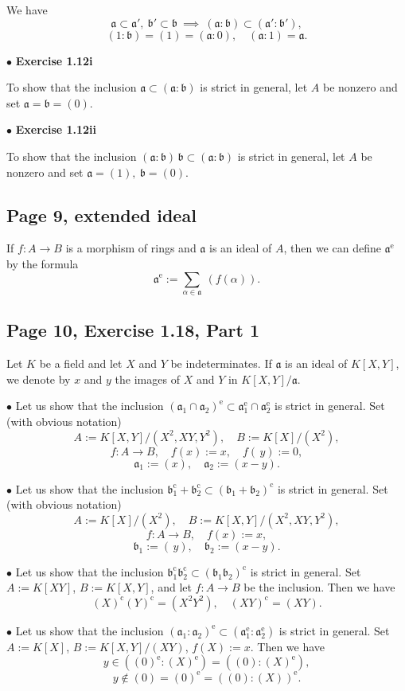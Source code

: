 \documentclass[parskip=half,fontsize=12pt]{scrartcl}%
\newcommand{\oo}{\operatorname}\newcommand{\ooo}{\operatorname*}
\newcommand{\mf}{\mathfrak}
\newcommand{\bbb}{\mf b}
\newcommand{\bu}{\bullet}
\begin{document}
We have 
$$
\mf a\subset\mf a',\ \bbb'\subset\bbb\ \implies\ (\mf a:\bbb)\subset(\mf a':\bbb'),
$$ 
$$
(1:\bbb)=(1)=(\mf a:0),\quad(\mf a:1)=\mf a.
$$

$\bu$ \textbf{Exercise 1.12i}%

To show that the inclusion $\mf a\subset(\mf a:\bbb)$ is strict in general, let $A$ be nonzero and set $\mf a=\bbb=(0)$.

$\bu$ \textbf{Exercise 1.12ii}%

To show that the inclusion $(\mf a\!:\!\bbb)\,\bbb\subset(\mf a:\bbb)$ is strict in general, let $A$ be nonzero and set $\mf a=(1),\ \bbb=(0)$.

\subsection{Page 9, extended ideal}%

If $f:A\to B$ is a morphism of rings and $\mf a$ is an ideal of $A$, then we can define $\mf a^{\oo e}$ by the formula
$$
\mf a^{\oo e}:=\sum_{\alpha\in\mf a}\ (f(\alpha)).
$$

\subsection{Page 10, Exercise 1.18, Part 1}%

Let $K$ be a field and let $X$ and $Y$ be indeterminates. If $\mf a$ is an ideal of $K[X,Y]$, we denote by $x$ and $y$ the images of $X$ and $Y$ in $K[X,Y]/\mf a$.

$\bu$ Let us show that the inclusion $(\mf a_1\cap\mf a_2)^{\oo e}\subset\mf a_1^{\oo e}\cap\mf a_2^{\oo e}$ is strict in general. Set (with obvious notation) 
$$
A:=K[X,Y]/(X^2,XY,Y^2),\quad B:=K[X]/(X^2),
$$ 
$$
f:A\to B,\quad f(x):=x,\quad f(\,y):=0,
$$ 
$$
\mf a_1:=(x),\quad\mf a_2:=(x-y).
$$

$\bu$ Let us show that the inclusion $\bbb_1^{\oo c}+\bbb_2^{\oo c}\subset(\bbb_1+\bbb_2)^{\oo c}$ is strict in general. Set (with obvious notation) 
$$
A:=K[X]/(X^2),\quad B:=K[X,Y]/(X^2,XY,Y^2),
$$ 
$$
f:A\to B,\quad f(x):=x,
$$ 
$$
\bbb_1:=(\,y),\quad\bbb_2:=(x-y).
$$

$\bu$ Let us show that the inclusion $\bbb_1^{\oo c}\bbb_2^{\oo c}\subset(\bbb_1\bbb_2)^{\oo c}$ is strict in general. Set $A:=K[XY]$, $B:=K[X,Y]$, and let $f:A\to B$ be the inclusion. Then we have 
$$
(X)^{\oo c}(Y)^{\oo c}=(X^2Y^2),\quad(XY)^{\oo c}=(XY).
$$

$\bu$ Let us show that the inclusion $(\mf a_1:\mf a_2)^{\oo e}\subset(\mf a_1^{\oo e}:\mf a_2^{\oo e})$ is strict in general. Set $A:=K[X]$, $B:=K[X,Y]/(XY)$, $f(X):=x$. Then we have 
$$
y\in((0)^{\oo e}:(X)^{\oo e})=((0):(X)^{\oo e}),
$$ 
$$y\notin(0)=(0)^{\oo e}=((0):(X))^{\oo e}.$$
\end{document}
